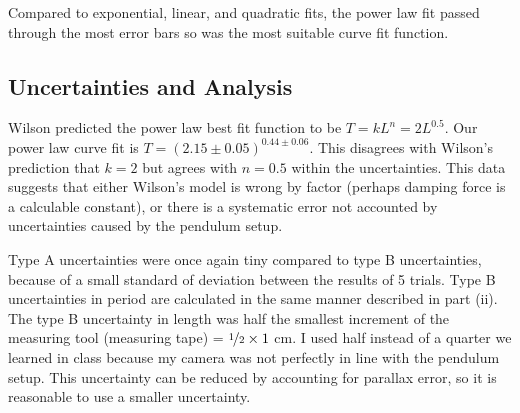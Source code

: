 \documentclass[notitlepage, twocolumn, 12pt]{article}
\begin{document}
    Compared to exponential, linear, and quadratic fits, the power law fit passed through the most error bars so was the most suitable curve fit function.

    \subsection*{Uncertainties and Analysis}
    Wilson predicted the power law best fit function to be $T = kL^n = 2L^{0.5}$. Our power law curve fit is $T = (2.15 \pm 0.05)^{0.44\pm 0.06}$. This disagrees with Wilson's prediction that $k = 2$ but agrees with $n=0.5$ within the uncertainties.  This data suggests that either Wilson's model is wrong by factor (perhaps damping force is a calculable constant), or there is a systematic error not accounted by uncertainties caused by the pendulum setup. 

    Type A uncertainties were once again tiny compared to type B uncertainties, because of a small standard of deviation between the results of 5 trials. Type B uncertainties in period are calculated in the same manner described in part (ii). The type B uncertainty in length was half the smallest increment of the measuring tool (measuring tape) = $\nicefrac{1}{2}\times 1$ cm. I used half instead of a quarter we learned in class because my camera was not perfectly in line with the pendulum setup. This uncertainty can be reduced by accounting for parallax error, so it is reasonable to use a smaller uncertainty. 
    
\end{document}
